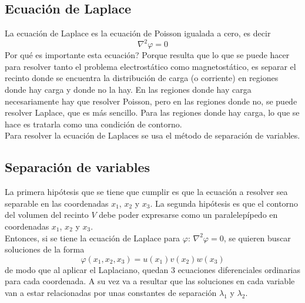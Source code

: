 

\subsection{Ecuación de Laplace}
La ecuación de Laplace es la ecuación de Poisson igualada a cero, es decir
\begin{equation*}
    \nabla^{2}\varphi = 0
\end{equation*}
Por qué es importante esta ecuación? Porque resulta que lo que se puede hacer para resolver tanto el problema electrostático como magnetostático, es separar el recinto donde se encuentra la distribución de carga (o corriente) en regiones donde hay carga y donde no la hay. En las regiones donde hay carga necesariamente hay que resolver Poisson, pero en las regiones donde no, se puede resolver Laplace, que es más sencillo. Para las regiones donde hay carga, lo que se hace es tratarla como una condición de contorno.\\
\indent Para resolver la ecuación de Laplaces se usa el método de separación de variables.




\subsection{Separación de variables}
La primera hipótesis que se tiene que cumplir es que la ecuación a resolver sea separable en las coordenadas $x_{1}$, $x_{2}$ y $x_{3}$. La segunda hipótesis es que el contorno del volumen del recinto $V$ debe poder expresarse como un paralelepípedo en coordenadas $x_{1}$, $x_{2}$ y $x_{3}$.\\
\indent Entonces, si se tiene la ecuación de Laplace para $\varphi$: $\nabla^{2} \varphi= 0$, se quieren buscar soluciones de la forma
\begin{equation*}
    \varphi(x_{1},x_{2},x_{3}) = 
    u(x_{1})v(x_{2})w(x_{3})
\end{equation*}
de modo que al aplicar el Laplaciano, quedan 3 ecuaciones diferenciales ordinarias para cada coordenada. A su vez va a resultar que las soluciones en cada variable van a estar relacionadas por unas constantes de separación $\lambda_{1}$ y $\lambda_{2}$.




